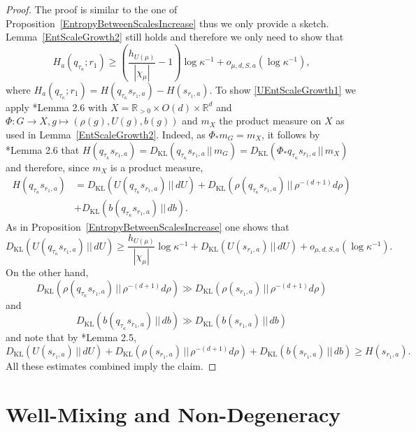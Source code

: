 \documentclass[10pt, english,oneside,reqno]{amsart}
\theoremstyle{plain}
\theoremstyle{remark}
\numberwithin{equation}{section}
\numberwithin{figure}{section}
\newcommand{\R}{\mathbb{R}}
\newcommand{\Haarof}[1]{m_{#1}}
\begin{document}
\begin{proof}
    The proof is similar to the one of Proposition~\ref{EntropyBetweenScalesIncrease} thus we only provide a sketch. Lemma~\ref{EntScaleGrowth2} still holds and therefore we only need to show that 
    \begin{equation}\label{UEntScaleGrowth1}
        H_a(q_{\tau_{\kappa}}; r_1) \geq \left( \frac{h_{U(\mu)}}{|\chi_{\mu}|} -1 \right)\log \kappa^{-1} + o_{\mu,d,S,a}(\log \kappa^{-1}),
    \end{equation}
    where $H_a(q_{\tau_{\kappa}}; r_1) = H(q_{\tau_{\kappa}}s_{r_1,a}) - H(s_{r_1,a})$. To show \eqref{UEntScaleGrowth1} we apply \cite{KittleKoglerEntropy}*{Lemma 2.6} with $X = \R_{>0} \times O(d) \times \R^d$ and $\Phi : G \to X, g \mapsto (\rho(g), U(g), b(g))$ and $\Haarof{X}$ the product measure on $X$ as used in Lemma~\ref{EntScaleGrowth2}. Indeed, as $\Phi_{*}\Haarof{G} = \Haarof{X}$, it follows by \cite{KittleKoglerEntropy}*{Lemma 2.6} that $H(q_{\tau_{\kappa}}s_{r_1,a}) = D_{\mathrm{KL}}(q_{\tau_{\kappa}}s_{r_1,a}\,||\, \Haarof{G}) = D_{\mathrm{KL}}(\Phi_{*}q_{\tau_{\kappa}}s_{r_1,a}\,||\, \Haarof{X})$ and therefore, since $\Haarof{X}$ is a product measure,
    \begin{align*}
    H(q_{\tau_{\kappa}}s_{r_1,a}) &= D_{\mathrm{KL}}(U(q_{\tau_{\kappa}}s_{r_1,a})\,||\, dU) + D_{\mathrm{KL}}(\rho(q_{\tau_{\kappa}}s_{r_1,a}) \,||\, \rho^{-(d + 1)}d\rho) \\ &+ D_{\mathrm{KL}}(b(q_{\tau_{\kappa}}s_{r_1,a})\,||\, db).
    \end{align*}
    As in Proposition~\ref{EntropyBetweenScalesIncrease} one shows that $$D_{\mathrm{KL}}(U(q_{\tau_{\kappa}}s_{r_1,a})\,||\, dU) \geq \frac{h_{U(\mu)}}{|\chi_{\mu}|}\log \kappa^{-1} + D_{\mathrm{KL}}(U(s_{r_1,a})\,||\, dU) + o_{\mu,d,S,a}(\log \kappa^{-1}).$$ On the other hand, $$D_{\mathrm{KL}}(\rho(q_{\tau_{\kappa}}s_{r_1,a}) \,||\, \rho^{-(d + 1)}d\rho) \gg D_{\mathrm{KL}}(\rho(s_{r_1,a}) \,||\, \rho^{-(d + 1)}d\rho)$$ and $$D_{\mathrm{KL}}(b(q_{\tau_{\kappa}}s_{r_1,a})\,||\, db) \gg D_{\mathrm{KL}}(b(s_{r_1,a})\,||\, db)$$ and note that by \cite{KittleKoglerEntropy}*{Lemma 2.5}, $$D_{\mathrm{KL}}(U(s_{r_1,a})\,||\, dU) + D_{\mathrm{KL}}(\rho(s_{r_1,a}) \,||\, \rho^{-(d + 1)}d\rho) + D_{\mathrm{KL}}(b(s_{r_1,a})\,||\, db) \geq H(s_{r_1,a}).$$ All these estimates combined imply the claim. 
\end{proof}

    \section{Well-Mixing and Non-Degeneracy}
\end{document}
